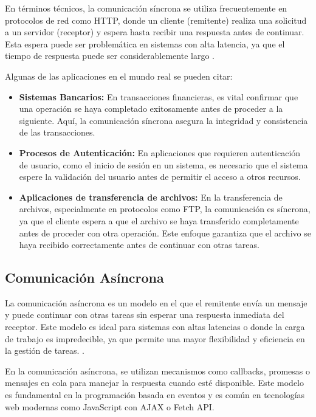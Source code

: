 			En términos técnicos, la comunicación síncrona se utiliza frecuentemente en protocolos de red como HTTP, donde un cliente (remitente) realiza una solicitud a un servidor (receptor) y espera hasta recibir una respuesta antes de continuar. Esta espera puede ser problemática en sistemas con alta latencia, ya que el tiempo de respuesta puede ser considerablemente largo \cite{Cai2023distributed,RamonCortes2021}.
			
			Algunas de las aplicaciones en el mundo real se pueden citar:
			
			\begin{itemize}
				\item \textbf{Sistemas Bancarios:} En transacciones financieras, es vital confirmar que una operación se haya completado exitosamente antes de proceder a la siguiente. Aquí, la comunicación síncrona asegura la integridad y consistencia de las transacciones.
				\item \textbf{Procesos de Autenticación:} En aplicaciones que requieren autenticación de usuario, como el inicio de sesión en un sistema, es necesario que el sistema espere la validación del usuario antes de permitir el acceso a otros recursos.
				\item \textbf{Aplicaciones de transferencia de archivos:} En la transferencia de archivos, especialmente en protocolos como FTP, la comunicación es síncrona, ya que el cliente espera a que el archivo se haya transferido completamente antes de proceder con otra operación. Este enfoque garantiza que el archivo se haya recibido correctamente antes de continuar con otras tareas.
			\end{itemize}
			
		\subsection{Comunicación Asíncrona}
			La comunicación asíncrona es un modelo en el que el remitente envía un mensaje y puede continuar con otras tareas sin esperar una respuesta inmediata del receptor. Este modelo es ideal para sistemas con altas latencias o donde la carga de trabajo es impredecible, ya que permite una mayor flexibilidad y eficiencia en la gestión de tareas.
			\cite{RamonCortes2021}.
			
			En la comunicación asíncrona, se utilizan mecanismos como callbacks, promesas o mensajes en cola para manejar la respuesta cuando esté disponible. Este modelo es fundamental en la programación basada en eventos y es común en tecnologías web modernas como JavaScript con AJAX o Fetch API.
			
